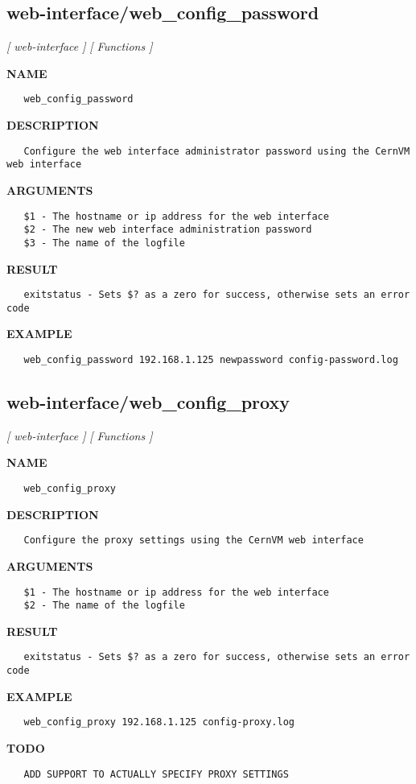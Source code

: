 \subsection{web-interface/web\_config\_password}
\textsl{[ web-interface ]}
\textsl{[ Functions ]}

\label{ch:robo78}
\label{ch:web_interface_web_config_password}
\textbf{NAME}
\begin{verbatim}
   web_config_password
\end{verbatim}
\textbf{DESCRIPTION}
\begin{verbatim}
   Configure the web interface administrator password using the CernVM web interface
\end{verbatim}
\textbf{ARGUMENTS}
\begin{verbatim}
   $1 - The hostname or ip address for the web interface
   $2 - The new web interface administration password
   $3 - The name of the logfile
\end{verbatim}
\textbf{RESULT}
\begin{verbatim}
   exitstatus - Sets $? as a zero for success, otherwise sets an error code
\end{verbatim}
\textbf{EXAMPLE}
\begin{verbatim}
   web_config_password 192.168.1.125 newpassword config-password.log
\end{verbatim}
\newpage
\subsection{web-interface/web\_config\_proxy}
\textsl{[ web-interface ]}
\textsl{[ Functions ]}

\label{ch:robo79}
\label{ch:web_interface_web_config_proxy}
\textbf{NAME}
\begin{verbatim}
   web_config_proxy
\end{verbatim}
\textbf{DESCRIPTION}
\begin{verbatim}
   Configure the proxy settings using the CernVM web interface
\end{verbatim}
\textbf{ARGUMENTS}
\begin{verbatim}
   $1 - The hostname or ip address for the web interface
   $2 - The name of the logfile
\end{verbatim}
\textbf{RESULT}
\begin{verbatim}
   exitstatus - Sets $? as a zero for success, otherwise sets an error code
\end{verbatim}
\textbf{EXAMPLE}
\begin{verbatim}
   web_config_proxy 192.168.1.125 config-proxy.log
\end{verbatim}
\textbf{TODO}
\begin{verbatim}
   ADD SUPPORT TO ACTUALLY SPECIFY PROXY SETTINGS
\end{verbatim}
\newpage
